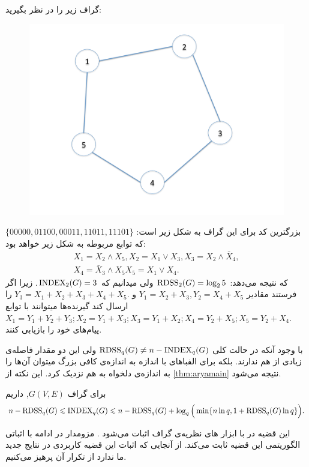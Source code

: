  \begin{example}
 	گراف زیر را در نظر بگیرید:
\begin{figure}[H]
	\centering
	\includegraphics[width=0.7\linewidth]{figs/chapter6/storage-graph-pent}
	\caption{}
	\label{fig:storage-graph-pent}
\end{figure}
بزرگترین کد برای این گراف به شکل زیر است:
$\{00000,01100,00011,11011,11101\}$
که توابع مربوطه به شکل زیر خواهد بود:
\begin{align*}
	X_1 = X_2 \wedge X_5, 
	X_2 = X_1 \vee X_3,
	X_3 = X_2 \wedge \bar{X}_4, \\
	X_4 = \bar{X}_3 \wedge X_5
	X_5 = X_1\vee X_4.
\end{align*}
که نتیجه می‌دهد:
$\mathrm{RDSS}_2(G) = \log_2 5$
ولی میدانیم که
$\mathrm{INDEX}_2(G)=3$.
زیرا اگر فرستند مقادیر
 $Y_1= X_2+X_3, Y_2= X_4+X_5$ 
 و
  $Y_3= X_1+X_2+X_3+X_4+X_5.$
  را ارسال کند گیرنده‌ها میتوانند با توابع
  $X_1 = Y_1 + Y_2+Y_3; X_2 = Y_1+X_3; X_3 = Y_1+X_2; X_4 = Y_2+X_5; X_5 = Y_2+X_4.$
  پیام‌های خود را بازیابی کنند.
 \end{example}
 
 با وجود آنکه در حالت کلی 
 $\mathrm{RDSS}_q(G) \ne n - \mathrm{INDEX}_q(G)$
 ولی این دو مقدار فاصله‌ی زیادی از هم ندارند. بلکه برای الفباهای با اندازه به اندازه‌ی کافی بزرگ میتوان آن‌ها را به اندازه‌ی دلخواه به هم نزدیک کرد. این نکته از 
 \autoref{thm:aryamain}
 نتیجه می‌شود.
 \begin{theorem}\label{thm:aryamain}
 	برای گراف
 	 $G(V,E)$,
 	 داریم
 	\begin{align}
 		n - \mathrm{RDSS}_q(G) \leqslant \mathrm{INDEX}_q(G) \leqslant n -\mathrm{RDSS}_q(G) + \log_q\Big(\min\{n\ln q, 1+ \mathrm{RDSS}_q(G)\ln q \}\Big). 
 	\end{align}
 \end{theorem}
 
 این قضیه در
 \cite{4691014}
 با ابزار های نظریه‌ی گراف اثبات می‌شود . مزومدار در ادامه با اثباتی الگوریتمی این قضیه ثابت می‌کند. از آنجایی که اثبات این قضیه کاربردی در نتایج جدید ما ندارد از تکرار آن پرهیز می‌کنیم.


